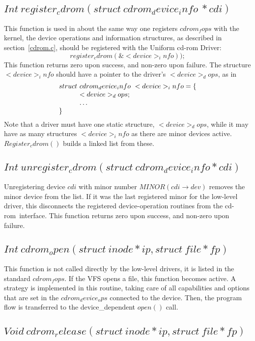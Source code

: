 \documentclass{article}
\def\cdrom{{\sc cd-rom}}
\def\UCD{{\sc Uniform cd-rom Driver}}
\begin{document}
\subsection{$Int\ register_cdrom( struct\ cdrom_device_info\ * cdi)$}

This function is used in about the same way one registers $cdrom_fops$
with the kernel, the device operations and information structures,
as described in section~\ref{cdrom.c}, should be registered with the
\UCD:
$$
register_cdrom(\&<device>_info));
$$
This function returns zero upon success, and non-zero upon
failure. The structure $<device>_info$ should have a pointer to the
driver's $<device>_dops$, as in 
$$
\vbox{\halign{&$#$\hfil\cr
struct\ &cdrom_device_info\ <device>_info = \{\cr
& <device>_dops;\cr
&\ldots\cr
\}\cr
}}$$
Note that a driver must have one static structure, $<device>_dops$, while
it may have as many structures $<device>_info$ as there are minor devices
active. $Register_cdrom()$ builds a linked list from these. 

\subsection{$Int\ unregister_cdrom(struct\ cdrom_device_info * cdi)$}

Unregistering device $cdi$ with minor number $MINOR(cdi\to dev)$ removes
the minor device from the list. If it was the last registered minor for
the low-level driver, this disconnects the registered device-operation
routines from the \cdrom\ interface. This function returns zero upon
success, and non-zero upon failure.

\subsection{$Int\ cdrom_open(struct\ inode * ip, struct\ file * fp)$}

This function is not called directly by the low-level drivers, it is
listed in the standard $cdrom_fops$. If the VFS opens a file, this
function becomes active. A strategy is implemented in this routine,
taking care of all capabilities and options that are set in the
$cdrom_device_ops$ connected to the device. Then, the program flow is
transferred to the device_dependent $open()$ call.

\subsection{$Void\ cdrom_release(struct\ inode *ip, struct\ file
*fp)$}
\end{document}
